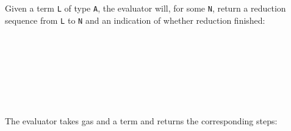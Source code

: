 Given a term \texttt{L} of type \texttt{A}, the evaluator will, for some
\texttt{N}, return a reduction sequence from \texttt{L} to \texttt{N}
and an indication of whether reduction finished:

\begin{fence}
\begin{code}%
\>[0]\AgdaSpace{}%
\AgdaSpace{}%
\AgdaSymbol{\{}\AgdaSymbol{\}}\AgdaSpace{}%
\AgdaSymbol{:}\AgdaSpace{}%
\AgdaSpace{}%
\AgdaSpace{}%
\AgdaSpace{}%
\AgdaSpace{}%
\AgdaSpace{}%
\<%
\\
%
\\[\AgdaEmptyExtraSkip]%
\>[0][@{}l@{\AgdaIndent{0}}]%
\>[2]\AgdaSpace{}%
\AgdaSymbol{:}\AgdaSpace{}%
\AgdaSymbol{\{}\AgdaSpace{}%
\AgdaSpace{}%
\AgdaSymbol{:}\AgdaSpace{}%
\AgdaSpace{}%
\AgdaSpace{}%
\AgdaSymbol{\}}\<%
\\
\>[2][@{}l@{\AgdaIndent{0}}]%
\>[4]\AgdaSpace{}%
\AgdaSpace{}%
\AgdaSpace{}%
\<%
\\
%
\>[4]%
\>[2056I]\AgdaSpace{}%
\<%
\\
\>[.][@{}l@{}]\<[2056I]%
\>[6]\AgdaComment{----------}\<%
\\
%
\>[4]\AgdaSpace{}%
\AgdaSpace{}%
\<%
\end{code}
\end{fence}

The evaluator takes gas and a term and returns the corresponding steps:


